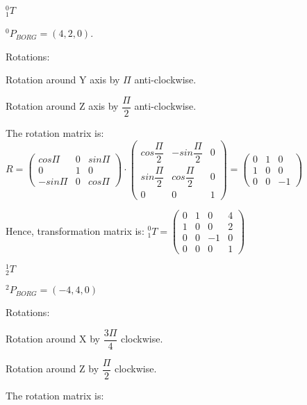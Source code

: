 \documentclass[12pt]{article}
\begin{document}
\begin{list}{)~}{}
\item
$_{1}^{0}T$

$^0 P_{BORG} = \left(4, 2, 0\right)$.

Rotations:

\begin{list}{)~}{}
\item Rotation around Y axis by $\Pi$ anti-clockwise.
\item Rotation around Z axis by $\dfrac{\Pi}{2}$ anti-clockwise.
\end{list}

The rotation matrix is:
$R=\left(\begin{array}{ccc}
cos \Pi & 0 & sin \Pi \\
0 & 1 & 0 \\
-sin \Pi & 0 & cos \Pi \end{array}\right) \cdot 
\left(\begin{array}{ccc}
cos \dfrac{\Pi}{2} & -sin \dfrac{\Pi}{2} & 0 \\
sin \dfrac{\Pi}{2} & cos \dfrac{\Pi}{2} & 0 \\
0 & 0 & 1\end{array}\right) = 
\left(\begin{array}{ccc}
0 & 1 & 0 \\
1 & 0 & 0 \\
0 & 0 & -1\end{array}\right)$

Hence, transformation matrix is:
$_{1}^{0}T = \left(\begin{array}{cccc}
0 & 1 & 0 & 4 \\
1 & 0 & 0 & 2\\
0 & 0 & -1 & 0\\
0 & 0 & 0 & 1\end{array}\right)$

\item
$_{2}^1T$

$^2 P_{BORG} = \left(-4, 4, 0\right)$

Rotations:
\begin{list}{)~}{}
\item Rotation around X by $\dfrac{3\Pi}{4}$ clockwise.
\item Rotation around Z by $\dfrac{\Pi}{2}$ clockwise.
\end{list}

The rotation matrix is:


\end{list}
\end{document}
